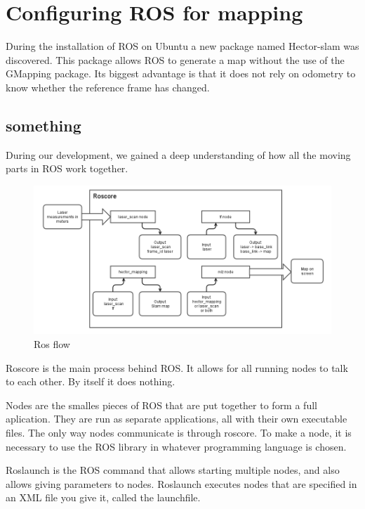 \clearpage
\section{Configuring ROS for mapping}

During the installation of ROS on Ubuntu a new package named Hector-slam was discovered. 
This package allows ROS to generate a map without the use of the GMapping package. Its biggest advantage is that it does not rely on odometry to know whether the reference frame has changed.

\subsection{something}
During our development, we gained a deep understanding of how all the moving parts in ROS work together.


\begin{figure}[H]
	\centering
	\includegraphics[width=.8\linewidth]{images/ROSflow.png}
	\caption{Ros flow}
\end{figure}

Roscore is the main process behind ROS. It allows for all running nodes to talk to each other. By itself it does nothing.

Nodes are the smalles pieces of ROS that are put together to form a full aplication. They are run as separate applications, all with their own executable files. The only way nodes communicate is through roscore. To make a node, it is necessary to use the ROS library in whatever programming language is chosen.

Roslaunch is the ROS command that allows starting multiple nodes, and also allows giving parameters to nodes. Roslaunch executes nodes that are specified in an XML file you give it, called the launchfile.

